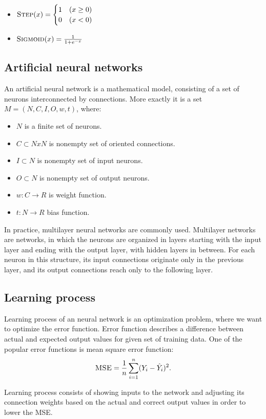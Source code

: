 \begin{itemize}
\item $\textsc{Step}(x)=\begin{cases} 1 & (x \geq 0) \\ 0 & (x < 0) \end{cases}$
\item $\textsc{Sigmoid}(x) = \frac{1}{1+e^{-x}} $
\end{itemize}

\subsection{Artificial neural networks}
An artificial neural network is a mathematical model, consisting of a set of neurons interconnected by connections.
More exactly it is a set 
$M  =  (N,C,I,O,w,t)$,  where:
\begin{itemize}
\item $N$  is  a  finite  set  of  neurons.
\item $C \subset N x N$  is  nonempty  set  of  oriented  connections.
\item $I \subset N$  is  nonempty  set  of  input  neurons.
\item $O \subset N$  is  nonempty  set  of  output  neurons.
\item $w : C \to R$  is  weight  function.
\item $t : N\to R$  bias  function.
\end{itemize}

In practice, multilayer neural networks are commonly used. Multilayer networks are networks, in which the neurons are organized in layers starting with the input layer and ending with the output layer, with hidden layers in between. For each neuron in this structure, its input connections originate only in the previous layer, and its output connections reach only to the following layer.

\subsection{Learning process}
Learning process of an neural network is an optimization problem, where we want to optimize the error function. Error function describes a difference between actual and expected output values for given set of training data. One of the popular error functions is mean square error function:
\[
\textsc{MSE} = \frac{1}{n} \sum_{i=1}^{n} (Y_{i} - \hat{Y}_{i})^2.
\]

Learning process consists of showing inputs to the network and adjusting its connection weights based on the actual and correct output values in order to lower the \textsc{MSE}.

